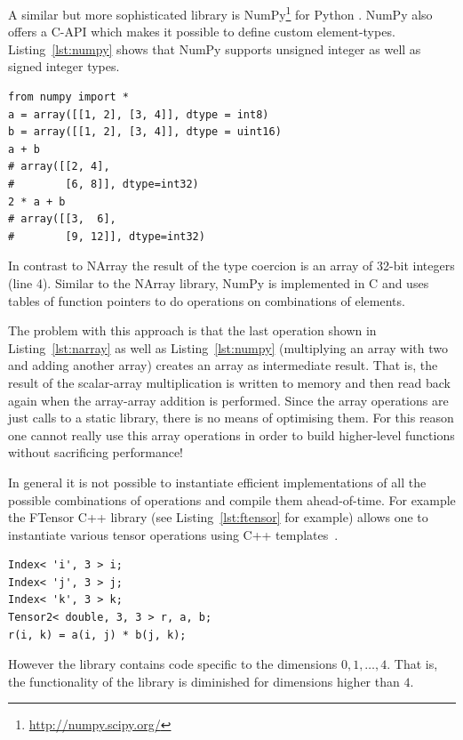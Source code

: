 \documentclass[12pt,a4paper,oneside,openright]{book}
\newcommand{\Eg}{For example }
\newcommand{\Ie}{That is, }
\newcommand{\lst}[1]{Listing~\ref{lst:#1}}
\newcommand{\pythonout}{Comment lines (preceded with ``\#'') show the output of the program}
\begin{document}
\begin{CJK}{UTF8}{}
A similar but more sophisticated library is NumPy\footnote{\url{http://numpy.scipy.org/}} for Python \citep[also see][]{Oliphant2006}. NumPy also offers a C-\acs{API} which makes it possible to define custom element-types. \lst{numpy} shows that NumPy supports unsigned integer as well as signed integer types. 
\lstset{language=Python,frame=single,numbers=left}
\begin{lstlisting}[float,caption={Array operations in Python using NumPy. \pythonout},label=lst:numpy]
from numpy import *
a = array([[1, 2], [3, 4]], dtype = int8)
b = array([[1, 2], [3, 4]], dtype = uint16)
a + b
# array([[2, 4],
#        [6, 8]], dtype=int32)
2 * a + b
# array([[3,  6],
#        [9, 12]], dtype=int32)
\end{lstlisting}
In contrast to NArray the result of the type coercion is an array of 32-bit integers (line 4). Similar to the NArray library, NumPy is implemented in C and uses tables of function pointers to do operations on combinations of elements.

The problem with this approach is that the last operation shown in \lst{narray} as well as \lst{numpy} (multiplying an array with two and adding another array) creates an array as intermediate result. \Ie the result of the scalar-array multiplication is written to memory and then read back again when the array-array addition is performed. Since the array operations are just calls to a static library, there is no means of optimising them. For this reason one cannot really use this array operations in order to build higher-level functions without sacrificing performance!

In general it is not possible to instantiate efficient implementations of all the possible combinations of operations and compile them ahead-of-time. \Eg the FTensor C++ library (see \lst{ftensor} for example) allows one to instantiate various tensor operations using C++ templates~\citep{RefWorks:559}.
\lstset{language=C++,frame=single,numbers=none}
\begin{lstlisting}[float,caption={Tensor operation with the FTensor C++ library},label=lst:ftensor]
Index< 'i', 3 > i;
Index< 'j', 3 > j;
Index< 'k', 3 > k;
Tensor2< double, 3, 3 > r, a, b;
r(i, k) = a(i, j) * b(j, k);
\end{lstlisting}
However the library contains code specific to the dimensions $0,1,\ldots,4$. \Ie the functionality of the library is diminished for dimensions higher than $4$.


\end{CJK}
\end{document}
